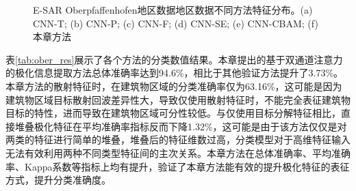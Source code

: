 \begin{figure}[ht!]

    \caption{E-SAR Oberpfaffenhofen地区数据地区数据不同方法特征分布。(a) CNN-T; (b) CNN-P; (c) CNN-F; (d) CNN-SE; (e) CNN-CBAM; (f) 本章方法}
    \label{fig:ober-tSNE}
\end{figure}

表\ref{tab:ober_res}展示了各个方法的分类数值结果。本章提出的基于双通道注意力的极化信息提取方法总体准确率达到94.6\%，相比于其他验证方法提升了3.73\%。本章方法的散射特征时，在建筑物区域的分类准确率仅为63.16\%，这可能是因为建筑物区域目标散射回波差异性大，导致仅使用散射特征时，不能完全表征建筑物目标的特性，进而导致在建筑物区域可分性较低。与仅使用目标分解特征相比，直接堆叠极化特征在平均准确率指标反而下降1.32\%，这可能是由于该方法仅仅是对两类的特征进行简单的堆叠，堆叠后的特征维数过高，分类模型对于高维特征输入无法有效利用两种不同类型特征间的主次关系。本章方法在总体准确率、平均准确率、Kappa系数等指标上均有提升，验证了本章方法能有效的提升极化特征的表征方式，提升分类准确度。

